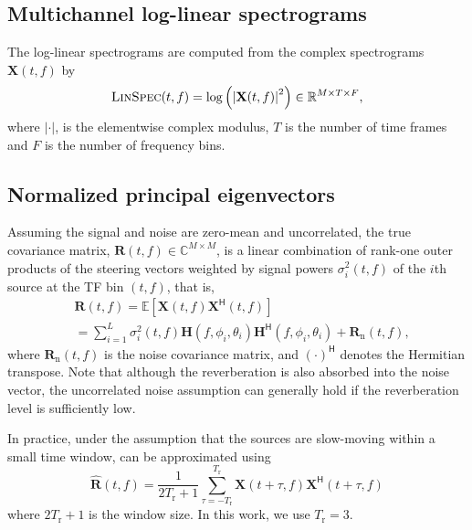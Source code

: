 \documentclass[journal]{IEEEtran}
\renewcommand{\H}{\mathsf{H}}
\newcommand{\E}{\mathbb{E}}
\begin{document}
\subsection{Multichannel log-linear spectrograms}

The log-linear spectrograms are computed from the complex spectrograms $\mathbf{X}(t,f)$ by
\begin{equation}
    \textsc{LinSpec}(t,f) = \log\left(\left\lvert\mathbf{X}(t,f)\right\rvert^2\right) \in\mathbb{R}^{M\times T\times F},
    \label{eq:linspec}
\end{equation}
where $\lvert\cdot\rvert$, is the elementwise complex modulus, $T$ is the number of time frames and $F$ is the number of frequency bins.

\subsection{Normalized principal eigenvectors}

Assuming the signal and noise are zero-mean and uncorrelated, the true covariance matrix, $\mathbf{R}(t,f) \in\mathbb{C}^{M\times M}$, is a linear combination of rank-one outer products of the steering vectors weighted by signal powers $\sigma_i^{2}(t,f)$ of the $i$th source at the TF bin $(t,f)$, that is,
\begin{align}
    & \mathbf{R}(t,f) = \E[\mathbf{X}(t,f)\mathbf{X}^{\H}(t,f)]\label{eq:ex_covmat}\\
    & = \sum_{i=1}^{L} \sigma_i^{2}(t,f)\mathbf{H}(f,\phi_i, \theta_i) \mathbf{H}^{\H}(f,\phi_i, \theta_i) + \mathbf{R}_\text{n}(t,f),\label{eq:true_covmat}
\end{align}
where $\mathbf{R}_\text{n}(t,f)$ is the noise covariance matrix, and $(\cdot)^{\mathbf{\H}}$ denotes the Hermitian transpose. Note that although the reverberation is also absorbed into the noise vector, the uncorrelated noise assumption can generally hold if the reverberation level is sufficiently low.

In practice, under the assumption that the sources are slow-moving within a small time window,  can be approximated using
\begin{equation}
    \mathbf{\hat{R}}(t,f)= \frac{1}{2T_\text{r}+1}\sum_{\tau=-T_\text{r}}^{T_\text{r}}\mathbf{X}(t+\tau,f)\mathbf{X}^{\H}(t+\tau,f)
\end{equation}
where $2T_\text{r}+1$ is the window size. In this work, we use $T_\text{r}=3$.
\end{document}
